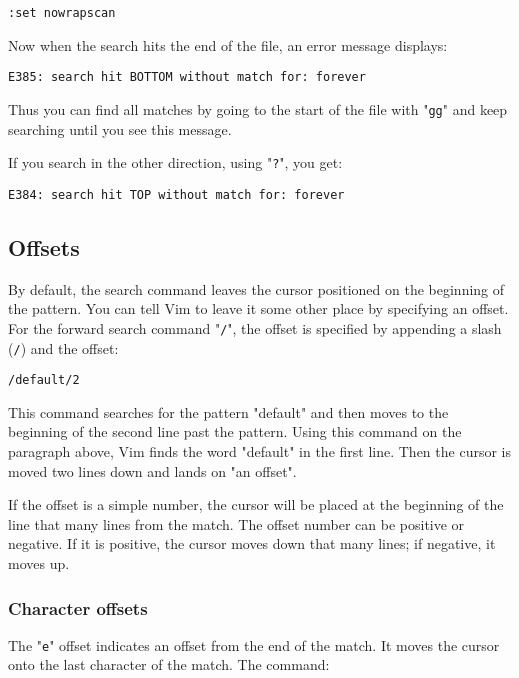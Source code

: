 \begin{Verbatim}[samepage=true]
 :set nowrapscan
\end{Verbatim}

Now when the search hits the end of the file, an error message displays:

\begin{Verbatim}[samepage=true]
    E385: search hit BOTTOM without match for: forever 
\end{Verbatim}

Thus you can find all matches by going to the start of the file with "\texttt{gg}" and keep searching until you see this message.

If you search in the other direction, using "\texttt{?}", you get:

\begin{Verbatim}[samepage=true]
    E384: search hit TOP without match for: forever 
\end{Verbatim}
\subsection{Offsets}
By default, the search command leaves the cursor positioned on the beginning of the pattern.
You can tell Vim to leave it some other place by specifying an offset.
For the forward search command "\texttt{/}", the offset is specified by appending a slash (\texttt{/}) and the offset:

\begin{Verbatim}[samepage=true]
 /default/2
\end{Verbatim}

This command searches for the pattern "default" and then moves to the beginning of the second line past the pattern.
Using this command on the paragraph above, Vim finds the word "default" in the first line.
Then the cursor is moved two lines down and lands on "an offset".

If the offset is a simple number, the cursor will be placed at the beginning of the line that many lines from the match.
The offset number can be positive or negative.
If it is positive, the cursor moves down that many lines; if negative, it moves up.

\subsubsection{Character offsets}
The "\texttt{e}" offset indicates an offset from the end of the match.
It moves the cursor onto the last character of the match.
The command:

